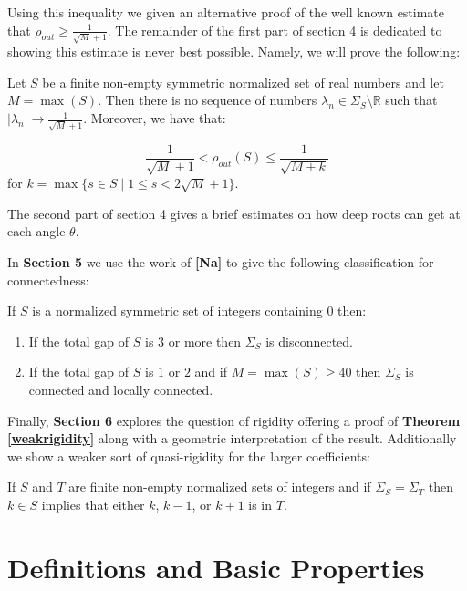 \documentclass[11pt]{amsart}
\numberwithin{theorem}{section} %
\numberwithin{corollary}{section}
\numberwithin{lemma}{section}
\numberwithin{proposition}{section}
\numberwithin{definition}{section}
\newenvironment{customthm}[1]
	{\renewcommand\theinnercustomthm{#1}\innercustomthm}
	{\endinnercustomthm}
\begin{document}
Using this inequality we given an alternative proof of the well known estimate that $\rho_{out} \geqslant \frac{1}{\sqrt{M}+1}$. The remainder of the first part of section 4 is dedicated to showing this estimate is never best possible. Namely, we will prove the following:

\begin{customthm}{\ref{rho-out}}
Let $S$ be a finite non-empty symmetric normalized set of real numbers and let $M = \max(S)$. Then there is no sequence of numbers $\lambda_n \in \Sigma_S \setminus \mathbb{R}$ such that $|\lambda_n| \rightarrow \frac{1}{\sqrt{M}+1}$. Moreover, we have that:

$$\frac{1}{\sqrt{M}+1} < \rho_{out}(S) \leqslant \frac{1}{\sqrt{M+k}} $$
for $k = \max \{ s \in S \mid 1 \leqslant s < 2\sqrt{M} + 1 \}$.
\end{customthm}

The second part of section 4 gives a brief estimates on how deep roots can get at each angle $\theta$.


In \textbf{Section 5} we use the work of \textbf{[Na]} to give the following classification for connectedness:

\begin{customthm}{\ref{conn-crit}}
If $S$ is a normalized symmetric set of integers containing $0$ then:
	\begin{enumerate}
		\item If the total gap of $S$ is $3$ or more then $\Sigma_S$ is disconnected.
		\item If the total gap of $S$ is $1$ or $2$ and if $M = \max(S) \geqslant 40$ then $\Sigma_S$ is connected and locally connected.
	\end{enumerate}
\end{customthm}


Finally, \textbf{Section 6} explores the question of rigidity offering a proof of \textbf{Theorem \ref{weakrigidity}} along with a geometric interpretation of the result. Additionally we show a weaker sort of quasi-rigidity for the larger coefficients:

\begin{customthm}{\ref{quasirigidity}}
If $S$ and $T$ are finite non-empty normalized sets of integers and if $\Sigma_S = \Sigma_T$ then $k \in S$ implies that either $k$, $k-1$, or $k+1$ is in $T$.
\end{customthm}




\section{Definitions and Basic Properties}
\end{document}
